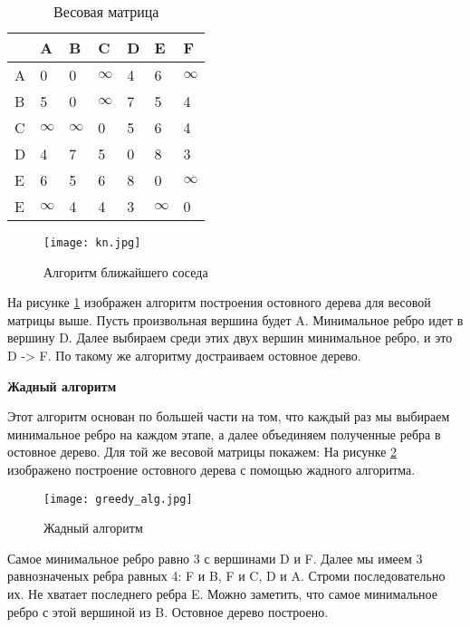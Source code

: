 \begin{table}[h]
    \centering
    \begin{tabular}[c]{ | l | l | l | l | l | l | l | }
        \hline
          & A & B & C & D & E & F \\ \hline
        A & 0 & 0 & $\infty$ & 4 & 6 & $\infty$ \\ \hline
        B & 5 & 0 & $\infty$ & 7 & 5 & 4\\ \hline
        C & $\infty$ & $\infty$ & 0 & 5 & 6 & 4 \\ \hline
        D & 4 & 7 & 5 & 0 & 8 & 3\\ \hline
        E & 6 & 5 & 6 & 8 & 0 & $\infty$\\ \hline
        E & $\infty$ & 4 & 4 & 3 & $\infty$ & 0 \\
        \hline
    \end{tabular}
    \caption{Весовая матрица}
\end{table}

\begin{figure}[!h]
    \centering 
    \texttt{[image: kn.jpg]}
    \caption{Алгоритм ближайшего соседа}
    \label{graph_kn}
\end{figure}

На рисунке \ref{graph_kn} изображен алгоритм построения остовного дерева для весовой матрицы выше. 
Пусть произвольная вершина будет A. Минимальное ребро идет в вершину D. 
Далее выбираем среди этих двух вершин минимальное ребро, и это D -> F. По такому же
алгоритму достраиваем остовное дерево.

\hspace{5mm}

\textbf{Жадный алгоритм}

Этот алгоритм основан по большей части на том, что каждый раз мы выбираем минимальное ребро
на каждом этапе, а далее объединяем полученные ребра в остовное дерево. Для той же весовой матрицы покажем:
На рисунке \ref{greedy_alg} изображено построение остовного дерева с помощью жадного алгоритма.

\begin{figure}[!h]
    \centering 
    \texttt{[image: greedy\_alg.jpg]}
    \caption{Жадный алгоритм}
    \label{greedy_alg}
\end{figure}

Самое минимальное ребро равно 3 с вершинами D и F. Далее мы имеем 3 равнозначеных ребра равных 4:
F и B, F и C, D и A. Строми последовательно их. Не хватает последнего ребра E. Можно заметить, что самое минимальное
ребро с этой вершиной из B. Остовное дерево построено.

